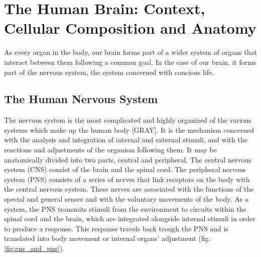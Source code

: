 
% 
\chapter{The Human Brain: Context, Cellular Composition and Anatomy}

As every organ in the body, our brain forms part of a wider system of organs that interact between them following a common goal.
In the case of our brain, it forms part of the nervous system, the system concerned with concious life.

\section{The Human Nervous System}
The nervous system is the most complicated and highly organized of the various systems which make up the human body [GRAY].
It is the mechanism concerned with the analysis and integration of internal and external stimuli, and with the reactions and adjustments of the organism following them.
It may be anatomically divided into two parts, central and peripheral.
The central nervous system (CNS) consist of the brain and the spinal cord.
The peripheral nervous system (PNS) consists of a series of nerves that link receptors on the body with the central nervous system.
These nerves are associated with the functions of the special and general senses and with the voluntary movements of the body.
As a system, the PNS transmits stimuli from the environment to circuits within the spinal cord and the brain, which are integrated alongside internal stimuli in order to produce a response.
This response travels back trough the PNS and is translated into body movement or internal organs' adjustment (fig. \ref{fig:cns_and_pns}).

